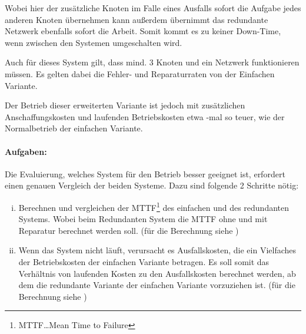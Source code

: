 \documentclass[
            a4paper
            ]{scrartcl}%
\newcommand{\printCostFactor}{\pgfmathparse{\costFactor}\pgfmathprintnumber[fixed,
precision=1]{\pgfmathresult}}
\begin{document}
Wobei hier der zusätzliche Knoten im Falle eines Ausfalls sofort die
Aufgabe jedes anderen Knoten übernehmen kann außerdem übernimmt das redundante
Netzwerk ebenfalls sofort die Arbeit. Somit kommt es zu keiner Down-Time, wenn
zwischen den Systemen umgeschalten wird.

Auch für dieses System gilt, dass mind. 3 Knoten und ein Netzwerk funktionieren
müssen. Es gelten dabei die Fehler- und Reparaturraten von der Einfachen
Variante.

Der Betrieb dieser erweiterten Variante ist jedoch mit zusätzlichen
Anschaffungskosten und laufenden Betriebskosten etwa \printCostFactor-mal so
teuer, wie der Normalbetrieb der einfachen Variante.

\paragraph{Aufgaben:} Die Evaluierung, welches System für den Betrieb besser geeignet ist,
erfordert einen genauen Vergleich der beiden Systeme. Dazu sind folgende 2
Schritte nötig:
\begin{enumerate}[i)]
    \item Berechnen und vergleichen der MTTF\footnote{MTTF\dots Mean Time to
        Failure} des einfachen und des redundanten Systems. Wobei beim
        Redundanten System die MTTF ohne und mit Reparatur berechnet werden
        soll. (für die Berechnung siehe )
    \item Wenn das System nicht läuft, verursacht es Ausfallskosten, die ein
        Vielfaches der Betriebskosten der einfachen Variante betragen. 
        Es soll somit das Verhältnis von laufenden Kosten zu den Ausfallskosten
        berechnet werden, ab dem die redundante Variante der einfachen Variante
        vorzuziehen ist. (für die Berechnung siehe )
\end{enumerate}
\end{document}
